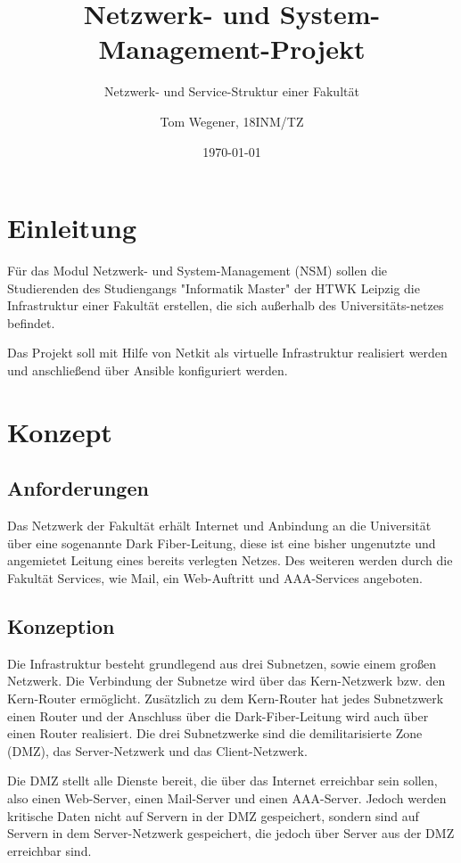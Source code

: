 \documentclass[a4paper]{article}
\title{Netzwerk- und System-Management-Projekt}
\subtitle{Netzwerk- und Service-Struktur einer Fakultät}
\date{\today}
\author{Tom Wegener, 18INM/TZ}
\begin{document}
\pagestyle{empty}

\maketitle

\newpage

\tableofcontents

\newpage

\pagestyle{fancy}

\setcounter{page}{1}

\section{Einleitung}
Für das Modul Netzwerk- und System-Management (NSM) sollen die Studierenden des Studiengangs "Informatik Master" der HTWK Leipzig die Infrastruktur einer Fakultät erstellen, die sich außerhalb des Universitäts-netzes befindet.

Das Projekt soll mit Hilfe von Netkit als virtuelle Infrastruktur realisiert werden und anschließend über Ansible konfiguriert werden.

\section{Konzept}

\subsection{Anforderungen}
Das Netzwerk der Fakultät erhält Internet und Anbindung an die Universität über eine sogenannte Dark Fiber-Leitung, diese ist eine bisher ungenutzte und angemietet Leitung eines bereits verlegten Netzes. Des weiteren werden durch die Fakultät Services, wie Mail, ein Web-Auftritt und AAA-Services angeboten.

\subsection{Konzeption}
Die Infrastruktur besteht grundlegend aus drei Subnetzen, sowie einem großen Netzwerk. Die Verbindung der Subnetze wird über das Kern-Netzwerk bzw. den Kern-Router ermöglicht. Zusätzlich zu dem Kern-Router hat jedes Subnetzwerk einen Router und der Anschluss über die Dark-Fiber-Leitung wird auch über einen Router realisiert. Die drei Subnetzwerke sind die demilitarisierte Zone (DMZ), das Server-Netzwerk und das Client-Netzwerk.

Die DMZ stellt alle Dienste bereit, die über das Internet erreichbar sein sollen, also einen Web-Server, einen Mail-Server und einen AAA-Server. Jedoch werden kritische Daten nicht auf Servern in der DMZ gespeichert, sondern sind auf Servern in dem Server-Netzwerk gespeichert, die jedoch über Server aus der DMZ erreichbar sind.
\end{document}
